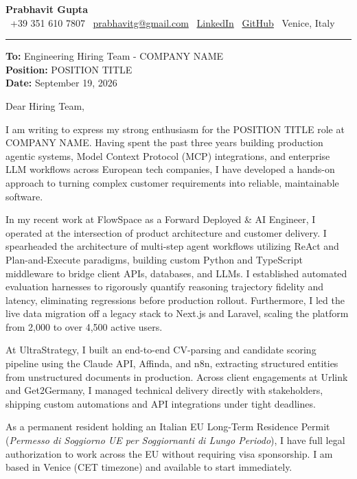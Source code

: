 \documentclass[a4paper,11pt]{article}
\begin{document}
{\huge\bfseries Prabhavit Gupta}\\[4pt]
{\small \faPhone\ +39 351 610 7807 \quad \faEnvelope\ \href{mailto:prabhavitg@gmail.com}{prabhavitg@gmail.com} \quad \faLinkedin\ \href{https://www.linkedin.com/in/prabhavit/}{LinkedIn} \quad \faGithub\ \href{https://github.com/prab-gupta}{GitHub} \quad \faMapMarker*\ Venice, Italy}

\vspace{8pt}
\rule{\textwidth}{0.6pt}
\vspace{8pt}

\textbf{To:} Engineering Hiring Team - COMPANY NAME\\[2pt]
\textbf{Position:} POSITION TITLE\\[2pt]
\textbf{Date:} September 19, 2026

\vspace{8pt}

Dear Hiring Team,

I am writing to express my strong enthusiasm for the POSITION TITLE role at COMPANY NAME. Having spent the past three years building production agentic systems, Model Context Protocol (MCP) integrations, and enterprise LLM workflows across European tech companies, I have developed a hands-on approach to turning complex customer requirements into reliable, maintainable software.

In my recent work at FlowSpace as a Forward Deployed \& AI Engineer, I operated at the intersection of product architecture and customer delivery. I spearheaded the architecture of multi-step agent workflows utilizing ReAct and Plan-and-Execute paradigms, building custom Python and TypeScript middleware to bridge client APIs, databases, and LLMs. I established automated evaluation harnesses to rigorously quantify reasoning trajectory fidelity and latency, eliminating regressions before production rollout. Furthermore, I led the live data migration off a legacy stack to Next.js and Laravel, scaling the platform from 2,000 to over 4,500 active users.

At UltraStrategy, I built an end-to-end CV-parsing and candidate scoring pipeline using the Claude API, Affinda, and n8n, extracting structured entities from unstructured documents in production. Across client engagements at Urlink and Get2Germany, I managed technical delivery directly with stakeholders, shipping custom automations and API integrations under tight deadlines.

As a permanent resident holding an Italian EU Long-Term Residence Permit (\textit{Permesso di Soggiorno UE per Soggiornanti di Lungo Periodo}), I have full legal authorization to work across the EU without requiring visa sponsorship. I am based in Venice (CET timezone) and available to start immediately.
\end{document}
